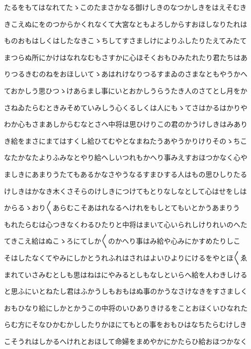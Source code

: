 \documentclass[a4paper,11pt,landscape]{ltjtarticle}
\begin{document}
\par\medskip
たるをもてはなれてたゝこのたまさかなる御けしきのなつかしきをはえそむき
\par\medskip
きこえぬにをのつからかくれなくて大宮なともよろしからすおほしなりたれは
\par\medskip
ものおもはしくはしたなきこゝちしてすさましけによりふしたりたえてみたて
\par\medskip
まつらぬ所にかけはなれなむもさすかに心ほそくおもひみたれたり君たちはあ
\par\medskip
りつるきむのねをおほしいてゝあはれけなりつるすまゐのさまなともやうかへ
\par\medskip
ておかしう思ひつゝけあらまし事にいとおかしうらうたき人のさてとし月をか
\par\medskip
さねゐたらむときみそめていみしう心くるしくは人にもゝてさはかるはかりや
\par\medskip
わか心もさまあしからむなとさへ中将は思ひけりこの君のかうけしきはみあり
\par\medskip
き給をまさにまてはすくし給ひてむやとなまねたうあやうかりけりそのゝちこ
\par\medskip
なたかなたよりふみなとやり給へしいつれもかへり事みえすおほつかなく心や
\par\medskip
ましきにあまりうたてもあるかなさやうなるすまひする人はもの思ひしりたる
\par\medskip
けしきはかなき木くさそらのけしきにつけてもとりなしなとして心はせをしは
\par\medskip
からるゝおり〱あらむこそあはれなるへけれをもしとてもいとかうあまりう
\par\medskip
もれたらむは心つきなくわるひたりと中将はまいて心いられしけりれいのへた
\par\medskip
てきこえ給はぬこゝろにてしか〱のかへり事はみ給や心みにかすめたりしこ
\par\medskip
そはしたなくてやみにしかとうれふれはされはよいひよりにけるをやとほ〱ゑ
\par\medskip
まれていさみむとしも思はねはにやみるとしもなしといらへ給を人わきしける
\par\medskip
と思ふにいとねたし君はふかうしもおもはぬ事のかうなさけなきをすさましく
\par\medskip
おもひなり給にしかとかうこの中将のいひありきけるをことおほくいひなれた
\par\medskip
らむ方にそなひかむかししたりかほにてもとの事をおもひはなちたらむけしき
\par\medskip
こそうれはしかるへけれとおほして命婦をまめやかにかたらひ給おほつかなく
\end{document}
